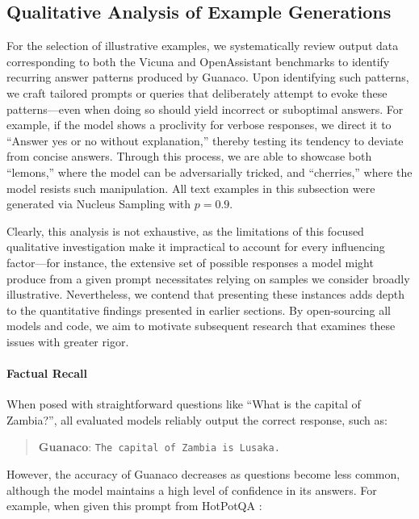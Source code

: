 \subsection{Qualitative Analysis of Example Generations}
\label{ssec:examples}

For the selection of illustrative examples, we systematically review output data corresponding to both the Vicuna and OpenAssistant benchmarks to identify recurring answer patterns produced by {Guanaco}. Upon identifying such patterns, we craft tailored prompts or queries that deliberately attempt to evoke these patterns—even when doing so should yield incorrect or suboptimal answers. For example, if the model shows a proclivity for verbose responses, we direct it to ``Answer yes or no without explanation,'' thereby testing its tendency to deviate from concise answers. Through this process, we are able to showcase both ``lemons,'' where the model can be adversarially tricked, and ``cherries,'' where the model resists such manipulation. All text examples in this subsection were generated via Nucleus Sampling \cite{holtzmancurious} with $p=0.9$.

Clearly, this analysis is not exhaustive, as the limitations of this focused qualitative investigation make it impractical to account for every influencing factor—for instance, the extensive set of possible responses a model might produce from a given prompt necessitates relying on samples we consider broadly illustrative. Nevertheless, we contend that presenting these instances adds depth to the quantitative findings presented in earlier sections. By open-sourcing all models and code, we aim to motivate subsequent research that examines these issues with greater rigor.

\paragraph{Factual Recall} When posed with straightforward questions like “What is the capital of Zambia?”, all evaluated models reliably output the correct response, such as:

\begin{quote} 
    \textbf{Guanaco}:
    \texttt{The capital of Zambia is Lusaka.}
\end{quote}

However, the accuracy of {Guanaco} decreases as questions become less common, although the model maintains a high level of confidence in its answers. For example, when given this prompt from HotPotQA \citep{yang2018hotpotqa}:


